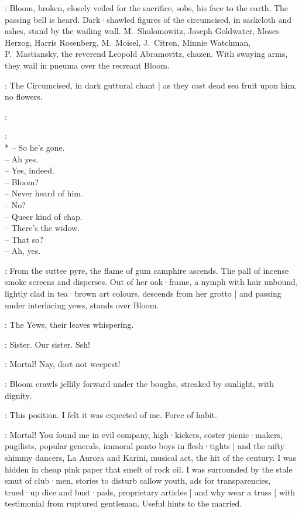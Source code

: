 :
Bloom,
broken,
closely veiled for the sacrifice,
sobs,
his face to the earth.
%
The passing bell is heard.
Dark·shawled figures of the circumcised,
in sackcloth and ashes,
stand by the wailing wall.
M.~Shulomowitz,
Joseph Goldwater,
Moses Herzog,
Harris Rosenberg,
M.~Moisel,
J.~Citron,
Minnie Watchman,
P.~Mastiansky,
the reverend Leopold Abramovitz,
chazen.
With swaying arms,
they wail in pneuma over the recreant Bloom.

:
The Circumcised,
in dark guttural chant |
as they cast dead sea fruit upon him,
no flowers.

\Circumcised:

\Voices:
\\*
-- So he's gone.\\
-- Ah yes.\\
-- Yes, indeed.\\
-- Bloom?\\
-- Never heard of him.\\
-- No?\\
-- Queer kind of chap.\\
-- There's the widow.\\
-- That so?\\
-- Ah, yes.

:
From the suttee pyre,
the flame of gum camphire ascends.
The pall of incense smoke screens and disperses.
Out of her oak·frame,
a nymph with hair unbound,
lightly clad in tea·brown art colours,
descends from her grotto |
and passing under interlacing yews,
stands over Bloom.

:
The Yews,
their leaves whispering.

\Yews:
Sister.
Our sister.
Ssh!

\Nymph[2]:
Mortal!
Nay,
dost not weepest!

:
Bloom crawls jellily forward under the boughs,
streaked by sunlight,
with dignity.

\Bloom:
This position.
I felt it was expected of me.
Force of habit.

\Nymph:
Mortal!
You found me in evil company,
high·kickers,
coster picnic·makers,
pugilists,
popular generals,
immoral panto boys in flesh·tights |
and the nifty shimmy dancers,
La Aurora and Karini,
musical act,
the hit of the century.
I was hidden in cheap pink paper that smelt of rock oil.
I was surrounded by the stale smut of club·men,
stories to disturb callow youth,
ads for transparencies,
trued·up dice and bust·pads,
proprietary articles |
%
and why wear a truss |
with testimonial from ruptured gentleman.
Useful hints to the married.

